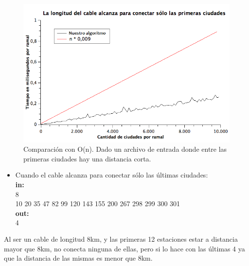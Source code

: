 \begin{figure}[H]
\begin{center}

  \includegraphics[width=\linewidth]{../graficos/ej1/PrimerasCiudades.png}
  \caption{{\small Comparación con O(n). Dado un archivo de entrada donde entre las primeras ciudades hay una distancia corta.}} \label{CasoRandom}
\endminipage

\end{center}
\end{figure}
\begin{itemize}
\item Cuando el cable alcanza para conectar sólo las últimas ciudades:\\
\textbf{in:}\\
8\\
10 20 35 47 82 99 120 143 155 200 267 298 299 300 301\\
\textbf{out:}\\
4\\
\end{itemize}

Al ser un cable de longitud 8km, y las primeras 12 estaciones estar a distancia mayor que 8km, no conecta ninguna de ellas, pero si lo hace con las últimas 4 ya que la distancia de las mismas es menor que 8km. \\

